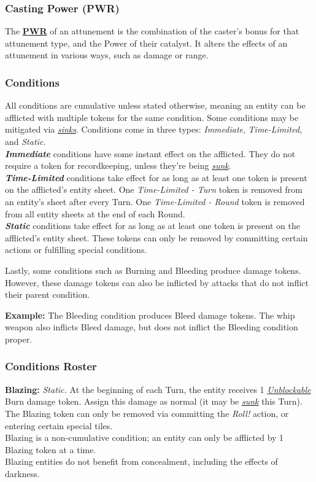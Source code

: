 \documentclass[12pt]{article}
\newcommand{\refto}[1]{\hyperlink{#1}{\textbf{#1}}}
\newcommand{\reftoit}[1]{\hyperlink{#1}{\emph{#1}}}
\begin{document}
\begin{multicols*}{2}
\subsubsection{Casting Power (PWR)}
\hypertarget{PWR}{}
The \refto{PWR} of an attunement is the combination of the caster’s bonus for that attunement type, and the Power of their catalyst. It alters the effects of an attunement in various ways, such as damage or range.

\subsubsection{Conditions}
All conditions are cumulative unless stated otherwise, meaning an entity can be afflicted with multiple tokens for the same condition. Some conditions may be mitigated via \reftoit{sinks}. Conditions come in three types: \emph{Immediate}, \emph{Time-Limited}, and \emph{Static.}\\

\emph{\textbf{Immediate}} conditions have some instant effect on the afflicted. They do not require a token for recordkeeping, unless they’re being \reftoit{sunk}.\\

\emph{\textbf{Time-Limited}} conditions take effect for as long as at least one token is present on the afflicted’s entity sheet. One \emph{Time-Limited - Turn} token is removed from an entity’s sheet after every Turn. One \emph{Time-Limited - Round} token is removed from all entity sheets at the end of each Round.\\

\emph{\textbf{Static}}\hypertarget{Static}{} conditions take effect for as long as at least one token is present on the afflicted’s entity sheet. These tokens can only be removed by committing certain actions or fulfilling special conditions.

Lastly, some conditions such as Burning and Bleeding produce damage tokens. However, these damage tokens can also be inflicted by attacks that do not inflict their parent condition.
\begin{tcolorbox}
\textbf{Example:} The Bleeding condition produces Bleed damage tokens. The whip weapon also inflicts Bleed damage, but does not inflict the Bleeding condition proper.
\end{tcolorbox}

\subsubsection{Conditions Roster}
\textbf{Blazing:} \emph{Static.} At the beginning of each Turn, the entity receives 1 \reftoit{Unblockable} Burn damage token. Assign this damage as normal (it may be \reftoit{sunk} this Turn).\\
The Blazing token can only be removed via committing the \emph{Roll!} action, or entering certain special tiles.\\
Blazing is a non-cumulative condition; an entity can only be afflicted by 1 Blazing token at a time.\\
Blazing entities do not benefit from concealment, including the effects of darkness.\\


\end{multicols*}
\end{document}
